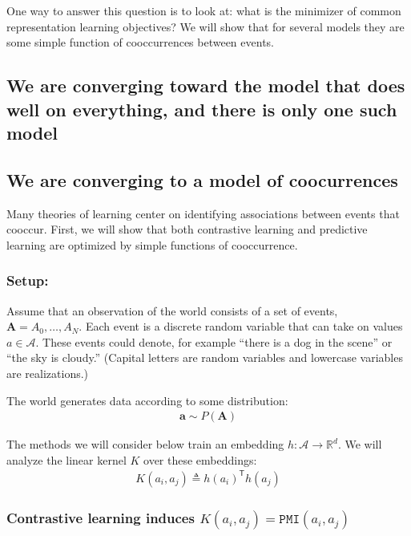 \documentclass{article}
\theoremstyle{plain}
\theoremstyle{definition}
\theoremstyle{remark}
\newcommand{\transpose}{\mathsf{T}}
\begin{document}
One way to answer this question is to look at: what is the minimizer of common representation learning objectives? We will show that for several models they are some simple function of cooccurrences between events.


\subsection{We are converging toward the model that does well on everything, and there is only one such model}


\subsection{We are converging to a model of coocurrences}

Many theories of learning center on identifying associations between events that cooccur. First, we will show that both contrastive learning and predictive learning are optimized by simple functions of cooccurrence.

\subsubsection{Setup:} 
Assume that an observation of the world consists of a set of events, $\mathbf{A} = {A_0, \ldots, A_N}$. Each event is a discrete random variable that can take on values $a \in \mathcal{A}$. These events could denote, for example ``there is a dog in the scene'' or ``the sky is cloudy.'' (Capital letters are random variables and lowercase variables are realizations.)

The world generates data according to some distribution:
\begin{align}
    \mathbf{a} \sim P(\mathbf{A})
\end{align}


The methods we will consider below train an embedding $h: \mathcal{A} \rightarrow \mathbb{R}^d$. We will analyze the linear kernel $K$ over these embeddings:
\begin{align}
    K(a_i, a_j) \triangleq h(a_i)^\transpose h(a_j)
\end{align}

\subsubsection{Contrastive learning induces $K(a_i,a_j) = \texttt{PMI}(a_i,a_j)$}
\end{document}
